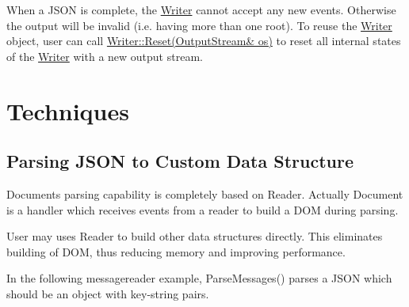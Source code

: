 When a J\+S\+ON is complete, the {\ttfamily \hyperlink{class_writer}{Writer}} cannot accept any new events. Otherwise the output will be invalid (i.\+e. having more than one root). To reuse the {\ttfamily \hyperlink{class_writer}{Writer}} object, user can call {\ttfamily \hyperlink{class_writer_a4e5bd5e6364edca476125b511b3dca9c}{Writer\+::\+Reset(\+Output\+Stream\& os)}} to reset all internal states of the {\ttfamily \hyperlink{class_writer}{Writer}} with a new output stream.\hypertarget{md_Commun_Externe_RapidJSON_doc_sax.zh-cn_Techniques}{}\section{Techniques}\label{md_Commun_Externe_RapidJSON_doc_sax.zh-cn_Techniques}
\hypertarget{md_Commun_Externe_RapidJSON_doc_sax.zh-cn_CustomDataStructure}{}\subsection{Parsing J\+S\+O\+N to Custom Data Structure}\label{md_Commun_Externe_RapidJSON_doc_sax.zh-cn_CustomDataStructure}
{\ttfamily Document}\textquotesingle{}s parsing capability is completely based on {\ttfamily Reader}. Actually {\ttfamily Document} is a handler which receives events from a reader to build a D\+OM during parsing.

User may uses {\ttfamily Reader} to build other data structures directly. This eliminates building of D\+OM, thus reducing memory and improving performance.

In the following {\ttfamily messagereader} example, {\ttfamily Parse\+Messages()} parses a J\+S\+ON which should be an object with key-\/string pairs.



